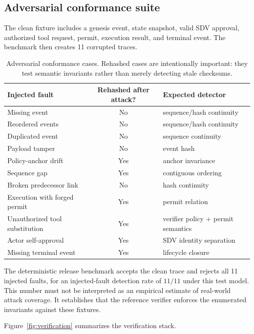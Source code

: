 \documentclass{article}
\begin{document}
\subsection{Adversarial conformance suite}

The clean fixture includes a genesis event, state snapshot, valid SDV approval,
authorized tool request, permit, execution result, and terminal event.
The benchmark then creates 11 corrupted traces.

\begin{table}[t]
\centering
\small
\begin{tabularx}{\linewidth}{X c l}
\toprule
Injected fault & Rehashed after attack? & Expected detector \\
\midrule
Missing event & No & sequence/hash continuity \\
Reordered events & No & sequence/hash continuity \\
Duplicated event & No & sequence continuity \\
Payload tamper & No & event hash \\
Policy-anchor drift & Yes & anchor invariance \\
Sequence gap & Yes & contiguous ordering \\
Broken predecessor link & No & hash continuity \\
Execution with forged permit & Yes & permit relation \\
Unauthorized tool substitution & Yes & verifier policy + permit semantics \\
Actor self-approval & Yes & SDV identity separation \\
Missing terminal event & Yes & lifecycle closure \\
\bottomrule
\end{tabularx}
\caption{Adversarial conformance cases. Rehashed cases are intentionally
important: they test semantic invariants rather than merely detecting stale
checksums.}
\label{tab:faults}
\end{table}

The deterministic release benchmark accepts the clean trace and rejects all
11 injected faults, for an injected-fault detection rate of $11/11$ under this
test model. This number must not be interpreted as an empirical estimate of
real-world attack coverage. It establishes that the reference verifier enforces
the enumerated invariants against these fixtures.

Figure~\ref{fig:verification} summarizes the verification stack.
\end{document}
